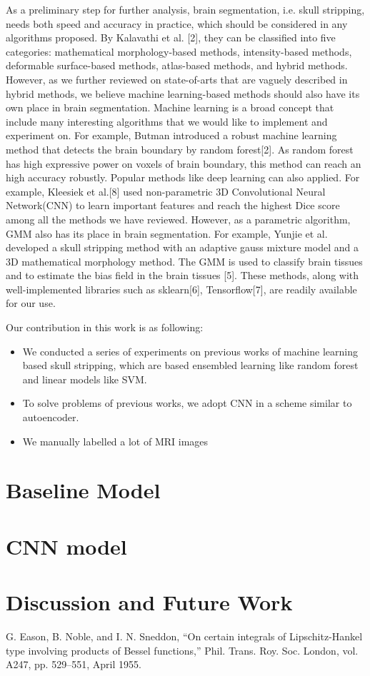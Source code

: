 \documentclass[conference]{IEEEtran}
\begin{document}
As a preliminary step for further analysis, brain segmentation, i.e. skull stripping, needs both speed and accuracy in practice, which should be considered in any algorithms proposed. By Kalavathi et al. [2], they can be classified into five categories: mathematical morphology-based methods, intensity-based methods, deformable surface-based methods, atlas-based methods, and hybrid methods. However, as we further reviewed on state-of-arts that are vaguely described in hybrid methods, we believe machine learning-based methods should also have its own place in brain segmentation. Machine learning is a broad concept that include many interesting algorithms that we would like to implement and experiment on. For example, Butman introduced a robust machine learning method that detects the brain boundary by random forest[2]. As random forest has high expressive power on voxels of brain boundary, this method can reach an high accuracy robustly. Popular methods like deep learning can also applied. For example, Kleesiek et al.[8] used non-parametric 3D Convolutional Neural Network(CNN) to learn important features and reach the highest Dice score among all the methods we have reviewed. However, as a parametric algorithm, GMM also has its place in brain segmentation. For example, Yunjie et al. developed a skull stripping method with an adaptive gauss mixture model and a 3D mathematical morphology method. The GMM is used to classify brain tissues and to estimate the bias field in the brain tissues [5]. These methods, along with well-implemented libraries such as sklearn[6], Tensorflow[7], are readily available for our use.

Our contribution in this work is as following:
\begin{itemize}
\item We conducted a series of experiments on previous works of machine learning based skull stripping, which are based ensembled learning like random forest and linear models like SVM. 
\item To solve problems of previous works, we adopt CNN in a scheme similar to autoencoder. 
\item We manually labelled a lot of MRI images 
\end{itemize}

\section{Baseline Model}

\section{CNN model}

\section{Discussion and Future Work}
\begin{thebibliography}{00}
 G. Eason, B. Noble, and I. N. Sneddon, ``On certain integrals of Lipschitz-Hankel type involving products of Bessel functions,'' Phil. Trans. Roy. Soc. London, vol. A247, pp. 529--551, April 1955.

\end{thebibliography}
\end{document}

